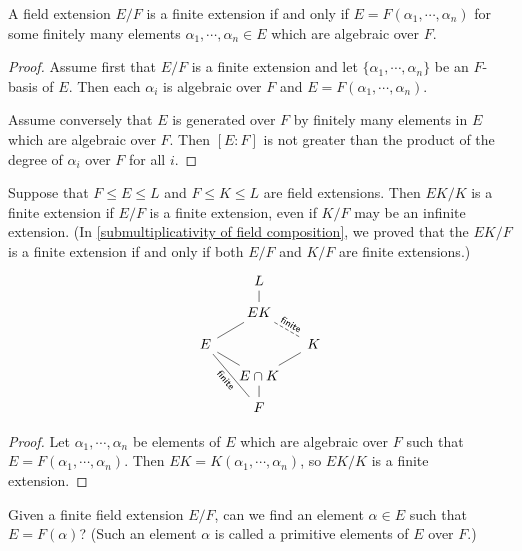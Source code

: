\begin{thm}
    A field extension $E/F$ is a finite extension if and only if $E=F(\alpha_1, \cdots, \alpha_n)$ for some finitely many elements $\alpha_1, \cdots, \alpha_n\in E$ which are algebraic over $F$.
\end{thm}
\begin{proof}
    Assume first that $E/F$ is a finite extension and let $\{\alpha_1, \cdots, \alpha_n\}$ be an $F$-basis of $E$.
    Then each $\alpha_i$ is algebraic over $F$ and $E=F(\alpha_1, \cdots, \alpha_n)$.

    Assume conversely that $E$ is generated over $F$ by finitely many elements in $E$ which are algebraic over $F$.
    Then $[E:F]$ is not greater than the product of the degree of $\alpha_i$ over $F$ for all $i$.
\end{proof}
\begin{cor}\label{shift of finiteness}
    Suppose that $F\leq E\leq L$ and $F\leq K\leq L$ are field extensions.
    Then $EK/K$ is a finite extension if $E/F$ is a finite extension, even if $K/F$ may be an infinite extension.
    (In \cref{submultiplicativity of field composition}, we proved that the $EK/F$ is a finite extension if and only if both $E/F$ and $K/F$ are finite extensions.)
    \begin{equation*}
    \begin{tikzcd}[every arrow/.append style={dash}, row sep=0.3cm, column sep=0.4cm]
        &
        L\arrow[d]
        &
        \\
        &
        EK\arrow[dl]\arrow[dr, dashed, "\textsf{finite}"{sloped}]
        &
        \\
        E\arrow[dr]\arrow[ddr, "\textsf{finite}"'{sloped}]
        &
        &
        K\arrow[dl]
        \\
        &
        E\cap K\arrow[d]
        &
        \\
        &
        F
        &
    \end{tikzcd}
    \end{equation*}
\end{cor}
\begin{proof}
    Let $\alpha_1, \cdots, \alpha_n$ be elements of $E$ which are algebraic over $F$ such that $E=F(\alpha_1, \cdots, \alpha_n)$.
    Then $EK=K(\alpha_1, \cdots, \alpha_n)$, so $EK/K$ is a finite extension.
\end{proof}
\begin{qst}\label{qst: primitive elements}
    Given a finite field extension $E/F$, can we find an element $\alpha\in E$ such that $E=F(\alpha)$? (Such an element $\alpha$ is called a primitive elements of $E$ over $F$.)
\end{qst}

